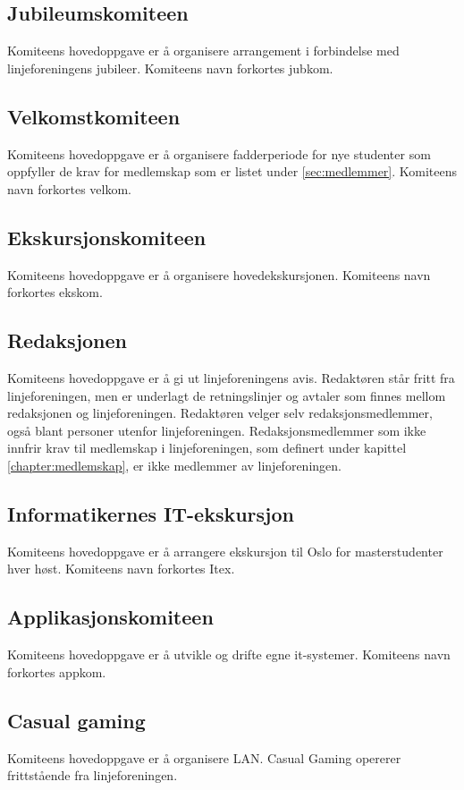 \subsection{Jubileumskomiteen}{
Komiteens hovedoppgave er å organisere arrangement i forbindelse med linjeforeningens jubileer. Komiteens navn forkortes jubkom.

}

\subsection{Velkomstkomiteen}{
Komiteens hovedoppgave er å organisere fadderperiode for nye studenter som oppfyller de krav for medlemskap som er listet under \ref{sec:medlemmer}. Komiteens navn forkortes velkom.
}

\subsection{Ekskursjonskomiteen}{
Komiteens hovedoppgave er å organisere hovedekskursjonen. Komiteens navn forkortes ekskom.
}
\subsection{Redaksjonen}{
Komiteens hovedoppgave er å gi ut linjeforeningens avis. Redaktøren står fritt fra linjeforeningen, men er underlagt de retningslinjer og avtaler som finnes mellom redaksjonen og linjeforeningen. Redaktøren velger selv redaksjonsmedlemmer, også blant personer utenfor linjeforeningen. Redaksjonsmedlemmer som ikke innfrir krav til medlemskap i linjeforeningen, som definert under kapittel \ref{chapter:medlemskap}, er ikke medlemmer av linjeforeningen.
}

\subsection{Informatikernes IT-ekskursjon}{
Komiteens hovedoppgave er å arrangere ekskursjon til Oslo for masterstudenter hver høst. Komiteens navn forkortes Itex.
}

\subsection{Applikasjonskomiteen}{
Komiteens hovedoppgave er å utvikle og drifte egne it-systemer. Komiteens navn forkortes appkom.
}

\subsection{Casual gaming}{
Komiteens hovedoppgave er å organisere LAN. Casual Gaming opererer frittstående fra linjeforeningen.
}


